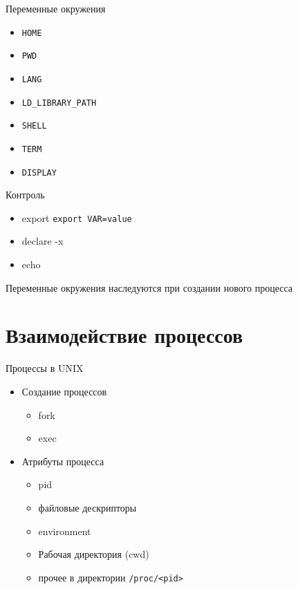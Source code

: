 \documentclass[ignorenonframetext, professionalfonts, hyperref={unicode}]{beamer}
\begin{document}
\begin{frame}{Переменные окружения}
  \begin{itemize}
    \item {\tt HOME}
    \item {\tt PWD}
    \item {\tt LANG}
    \item {\tt LD\_LIBRARY\_PATH}
    \item {\tt SHELL}
    \item {\tt TERM}
    \item {\tt DISPLAY}
  \end{itemize}

  Контроль

  \begin{itemize}
    \item export {\tt export VAR=value}
    \item declare -x
    \item echo 
  \end{itemize}

  Переменные окружения наследуются при создании нового процесса
\end{frame}

\section{Взаимодействие процессов}
\begin{frame}{Процессы в UNIX}
  \begin{itemize}
    \item Создание процессов
      \begin{itemize}
        \item fork
        \item exec
      \end{itemize}
    \item Атрибуты процесса
      \begin{itemize}
        \item pid 
        \item файловые дескрипторы
        \item environment
        \item Рабочая директория (cwd)
        \item прочее в директории {\tt /proc/<pid>}
      \end{itemize}
  \end{itemize}
\end{frame}
\end{document}
